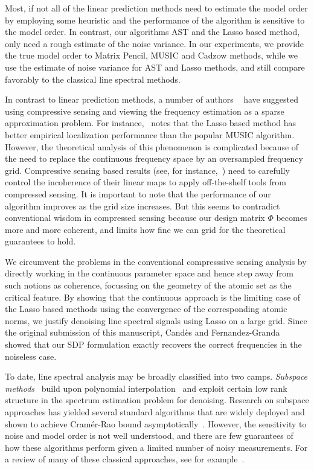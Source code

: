 Most, if not all of the linear prediction methods need to estimate the model
order by employing some heuristic and the performance of the algorithm is
sensitive to the model order. In contrast, our algorithms AST and the Lasso
based method, only need a rough estimate of the noise variance. In our experiments, we provide
the true model order to Matrix Pencil, MUSIC and Cadzow methods, while we use
the estimate of noise variance for AST and Lasso methods, and still compare favorably to the classical line spectral methods.

In contrast to linear prediction methods, a number of authors
~\cite{chen98spectrum,malioutov05,bourguignon2007irregular}
have suggested using compressive sensing and viewing the frequency estimation
as a sparse approximation problem. For instance,~\cite{malioutov05} notes that
the Lasso based method has better empirical localization performance than the
popular MUSIC algorithm. However, the theoretical analysis of this phenomenon
is complicated because of the need to replace the continuous frequency space by
an oversampled frequency grid. Compressive sensing based results (see, for
instance,~\cite{duartescs}) need to carefully control the incoherence of their
linear maps to apply off-the-shelf tools from compressed sensing. It is
important to note that the performance of our algorithm improves as the grid
size increases. But this seems to contradict conventional wisdom in compressed
sensing because our design matrix $\Phi$ becomes more and more coherent, and
limits how fine we can grid for the theoretical guarantees to hold.

We circumvent the problems in the conventional compresssive sensing analysis by
directly working in the continuous parameter space and hence step away from
such notions as coherence, focussing on the geometry of the atomic set as the
critical feature. By showing that the continuous approach is the limiting
case of  the Lasso based methods using the convergence of the corresponding
atomic norms, we justify denoising line spectral signals using Lasso on a
large grid. Since the original submission of this manuscript,
Cand\`es and Fernandez-Granda~\cite{CandesGranda} showed that our SDP
formulation exactly recovers the correct frequencies in the noiseless case.

To date, line spectral analysis may be broadly classified into two camps.
\emph{Subspace methods}~\cite{music,esprit,cadzow05,ssa} build upon polynomial
interpolation~\cite{prony1795} and exploit certain low rank structure in the
spectrum estimation problem for denoising. Research on subspace approaches has
yielded several standard algorithms that are widely deployed and shown to
achieve Cram\'{e}r-Rao bound asymptotically~\cite{fri,cramer-subspace}.
However, the sensitivity to noise and model order is not well understood, and
there are few guarantees of how these algorithms perform given a limited number
of noisy measurements. For a review of many of these classical approaches, see
for example~\cite{StoicaMoses}.

